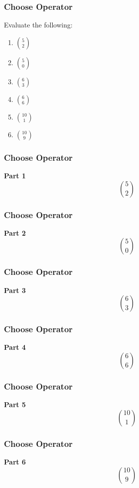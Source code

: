 \documentclass{beamer}
\begin{document}
\begin{frame}
\frametitle{Choose Operator}
\Large
\vspace{-1.5cm}
Evaluate the following:
\huge
\begin{multicols}{3}
    \begin{enumerate}
    \item ${5 \choose 2}$
    \item ${5 \choose 0}$
    \item ${6 \choose 3}$
    \item ${6 \choose 6}$
    \item ${10 \choose 1}$
    \item ${10 \choose 9}$
    \end{enumerate}        
  \end{multicols}
\end{frame}
\begin{frame}
\frametitle{Choose Operator}
\large
\vspace{-3cm}
\textbf{Part 1}
\huge
\[{5 \choose 2}\]

\end{frame}
\begin{frame}
\frametitle{Choose Operator}
\large
\vspace{-3cm}
\textbf{Part 2}
\huge
\[{5 \choose 0}\]

\end{frame}
\begin{frame}
\frametitle{Choose Operator}
\large
\vspace{-3cm}
\textbf{Part 3}
\huge
\[{6 \choose 3}\]

\end{frame}
\begin{frame}
\frametitle{Choose Operator}
\large
\vspace{-3cm}
\textbf{Part 4}
\huge
\[{6 \choose 6}\]

\end{frame}
\begin{frame}
\frametitle{Choose Operator}
\large
\vspace{-3cm}
\textbf{Part 5}
\huge
\[{10 \choose 1}\]

\end{frame}
\begin{frame}
\frametitle{Choose Operator}
\large
\vspace{-3cm}
\textbf{Part 6}
\huge
\[{10 \choose 9}\]

\end{frame}
\end{document}
